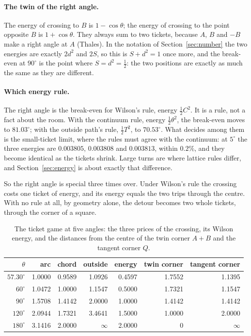 \documentclass[11pt]{article}
\begin{document}
\paragraph{The twin of the right angle.} The energy of crossing to $B$ is $1-\cos\theta$;
the energy of crossing to the point opposite $B$ is $1+\cos\theta$. They always sum to two
tickets, because $A$, $B$ and $-B$ make a right angle at $A$ (Thales). In the notation of
Section~\ref{sec:number} the two energies are exactly $2d^2$ and $2S$, so this is $S+d^2=1$
once more, and the break-even at $90^\circ$ is the point where $S=d^2=\tfrac12$: the two
positions are exactly as much the same as they are different.

\paragraph{Which energy rule.} The right angle is the break-even for Wilson's rule, energy
$\tfrac12C^2$. It is a rule, not a fact about the room. With the continuum rule, energy
$\tfrac12\theta^2$, the break-even moves to $81.03^\circ$; with the outside path's rule,
$\tfrac12T^2$, to $70.53^\circ$. What decides among them is the small-ticket limit, where
the rules must agree with the continuum: at $5^\circ$ the three energies are $0.003805$,
$0.003808$ and $0.003813$, within $0.2\%$, and they become identical as the tickets shrink.
Large turns are where lattice rules differ, and Section~\ref{sec:energy} is about exactly
that difference.

So the right angle is special three times over. Under Wilson's rule the crossing costs one
ticket of energy, and its energy equals the two trips through the centre. With no rule at all,
by geometry alone, the detour becomes two whole tickets, through the corner of a square.

\begin{table}[h!]\centering\small
\caption{The ticket game at five angles: the three prices of the crossing, its Wilson
energy, and the distances from the centre of the twin corner $A+B$ and the tangent
corner $Q$.}
\label{tab:tickets}
\begin{tabular}{rrrrrrr}\toprule
$\theta$ & arc & chord & outside & energy & twin corner & tangent corner \\ \midrule
$57.30^\circ$ & 1.0000 & 0.9589 & 1.0926 & 0.4597 & 1.7552 & 1.1395 \\
$60^\circ$ & 1.0472 & 1.0000 & 1.1547 & 0.5000 & 1.7321 & 1.1547 \\
$90^\circ$ & 1.5708 & 1.4142 & 2.0000 & 1.0000 & 1.4142 & 1.4142 \\
$120^\circ$ & 2.0944 & 1.7321 & 3.4641 & 1.5000 & 1.0000 & 2.0000 \\
$180^\circ$ & 3.1416 & 2.0000 & $\infty$ & 2.0000 & 0 & $\infty$ \\
\bottomrule\end{tabular}
\end{table}
\end{document}
